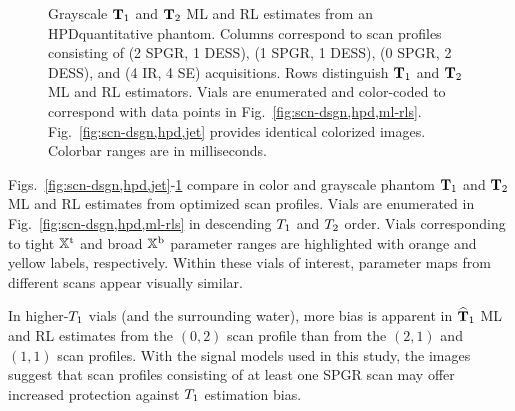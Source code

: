 \begin{figure*} [!tb]
	\centering
	\vspace{0cm}
	\caption{
		Grayscale $\mathbf{T}_1$ and $\mathbf{T}_2$ ML and RL estimates 
		from an HPD\regis quantitative phantom.
		Columns correspond to scan profiles consisting of 
		(2 SPGR, 1 DESS), (1 SPGR, 1 DESS), (0 SPGR, 2 DESS),
		and (4 IR, 4 SE) acquisitions. 
		Rows distinguish $\mathbf{T}_1$ and $\mathbf{T}_2$ ML and RL estimators. 
		Vials are enumerated and color-coded
		to correspond with data points in Fig.~\ref{fig:scn-dsgn,hpd,ml-rls}.
		Fig.~\ref{fig:scn-dsgn,hpd,jet} provides identical colorized images.
		Colorbar ranges are in milliseconds.
	}
	\label{fig:scn-dsgn,hpd,gray}
\end{figure*}

Figs.~\ref{fig:scn-dsgn,hpd,jet}-\ref{fig:scn-dsgn,hpd,gray} compare
in color and grayscale  
phantom $\mathbf{T}_1$ and $\mathbf{T}_2$ ML and RL estimates 
from optimized scan profiles. 
Vials are enumerated 
in Fig.~\ref{fig:scn-dsgn,hpd,ml-rls} 
in descending $T_1$ and $T_2$ order. 
Vials corresponding to tight $\mathbb{X}^\mathrm{t}$ 
and broad $\mathbb{X}^\mathrm{b}$ parameter ranges are highlighted 
with orange and yellow labels, respectively. 
Within these vials of interest, 
parameter maps from different scans appear visually similar.

In higher-$T_1$ vials (and the surrounding water),
more bias is apparent 
in $\widehat{\mathbf{T}}_1$ ML and RL estimates 
from the $(0,2)$ scan profile than 
from the $(2,1)$ and $(1,1)$ scan profiles. 
With the signal models used in this study,
the images suggest that scan profiles consisting 
of at least one SPGR scan may offer increased protection 
against $T_1$ estimation bias.

